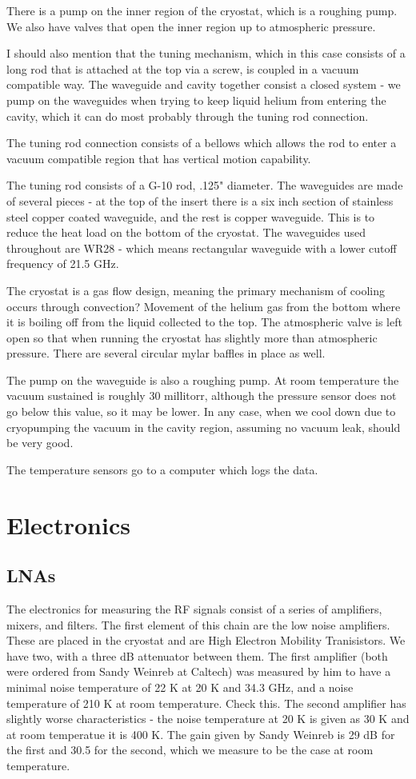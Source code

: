 \documentclass[11pt]{article}
\begin{document}
There is a pump on the inner region of the cryostat, which is a roughing pump. We also have valves that open the inner region up to atmospheric pressure.

I should also mention that the tuning mechanism, which in this case consists of a long rod that is attached at the top via a screw, is coupled in a vacuum compatible way. The waveguide and cavity together consist a closed system - we pump on the waveguides when trying to keep liquid helium from entering the cavity, which it can do most probably through the tuning rod connection. 

The tuning rod connection consists of a bellows which allows the rod to enter a vacuum compatible region that has vertical motion capability.

The tuning rod consists of a G-10 rod, .125" diameter. The waveguides are made of several pieces - at the top of the insert there is a six inch section of stainless steel copper coated waveguide, and the rest is copper waveguide. This is to reduce the heat load on the bottom of the cryostat. The waveguides used throughout are WR28 - which means rectangular waveguide with a lower cutoff frequency of 21.5 GHz.

The cryostat is a gas flow design, meaning the primary mechanism of cooling occurs through convection? Movement of the helium gas from the bottom where it is boiling off from the liquid collected to the top. The atmospheric valve is left open so that when running the cryostat has slightly more than atmospheric pressure. There are several circular mylar baffles in place as well.

The pump on the waveguide is also a roughing pump. At room temperature the vacuum sustained is roughly 30 millitorr, although the pressure sensor does not go below this value, so it may be lower. In any case, when we cool down due to cryopumping the vacuum in the cavity region, assuming no vacuum leak, should be very good.

The temperature sensors go to a computer which logs the data.

\section{Electronics}
\subsection{LNAs}
The electronics for measuring the RF signals consist of a series of amplifiers, mixers, and filters. The first element of this chain are the low noise amplifiers. These are placed in the cryostat and are High Electron Mobility Tranisistors. We have two, with a three dB attenuator between them. The first amplifier (both were ordered from Sandy Weinreb at Caltech) was measured by him to have a minimal noise temperature of 22 K at 20 K and 34.3 GHz, and a noise temperature of 210  K at room temperature. Check this. The second amplifier has slightly worse characteristics - the noise temperature at 20 K is given as 30 K and at room temperatue it is 400 K. The gain given by Sandy Weinreb is 29 dB for the first and 30.5 for the second, which we measure to be the case at room temperature.
\end{document}
